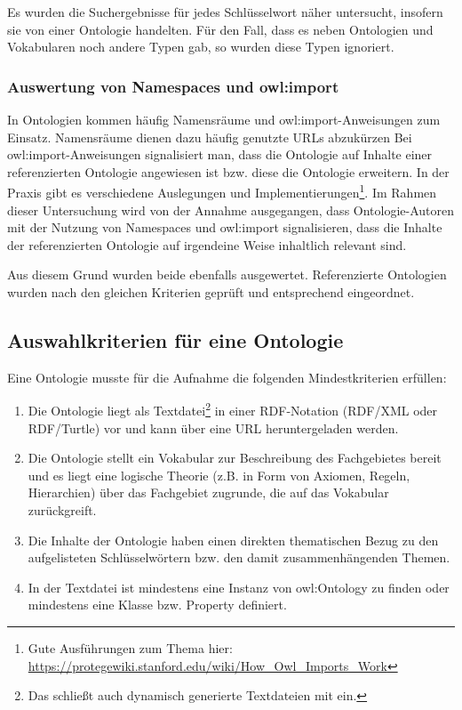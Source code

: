 \documentclass{article}
\begin{document}
Es wurden die Suchergebnisse für jedes Schlüsselwort näher untersucht, insofern sie von einer Ontologie handelten.
Für den Fall, dass es neben Ontologien und Vokabularen noch andere Typen gab, so wurden diese Typen ignoriert.

\subsubsection{Auswertung von Namespaces und owl:import}

In Ontologien kommen häufig Namensräume und owl:import-Anweisungen zum Einsatz.
Namensräume dienen dazu häufig genutzte URLs abzukürzen
Bei owl:import-Anweisungen signalisiert man, dass die Ontologie auf Inhalte einer referenzierten Ontologie angewiesen ist bzw. diese die Ontologie erweitern.
In der Praxis gibt es verschiedene Auslegungen und Implementierungen\footnote{Gute Ausführungen zum Thema hier: \url{https://protegewiki.stanford.edu/wiki/How_Owl_Imports_Work}}.
Im Rahmen dieser Untersuchung wird von der Annahme ausgegangen, dass Ontologie-Autoren mit der Nutzung von Namespaces und owl:import signalisieren, dass die Inhalte der referenzierten Ontologie auf irgendeine Weise inhaltlich relevant sind.

Aus diesem Grund wurden beide ebenfalls ausgewertet.
Referenzierte Ontologien wurden nach den gleichen Kriterien geprüft und entsprechend eingeordnet.

\subsection{Auswahlkriterien für eine Ontologie}

Eine Ontologie musste für die Aufnahme die folgenden Mindestkriterien erfüllen:

\begin{enumerate}
    \item Die Ontologie liegt als Textdatei\footnote{Das schließt auch dynamisch generierte Textdateien mit ein.} in einer RDF-Notation (RDF/XML oder RDF/Turtle) vor und kann über eine URL heruntergeladen werden.
    \item Die Ontologie stellt ein Vokabular zur Beschreibung des Fachgebietes bereit und es liegt eine logische Theorie (z.B. in Form von Axiomen, Regeln, Hierarchien) über das Fachgebiet zugrunde, die auf das Vokabular zurückgreift.
    \item Die Inhalte der Ontologie haben einen direkten thematischen Bezug zu den aufgelisteten Schlüsselwörtern bzw. den damit zusammenhängenden Themen.
    \item In der Textdatei ist mindestens eine Instanz von owl:Ontology zu finden oder mindestens eine Klasse bzw. Property definiert.
\end{enumerate}
\end{document}
